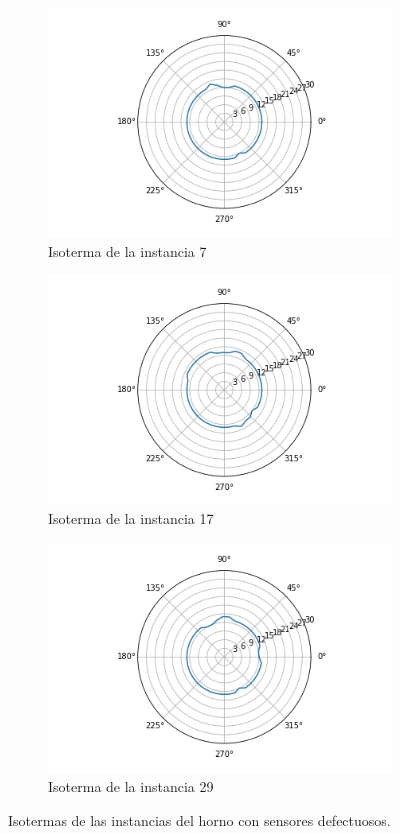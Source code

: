 \begin{figure}[H]
    \centering
    \begin{subfigure}{0.49\linewidth}
        \centering
        \includegraphics[scale=0.49]{img/EXP4/D4_30_40_7_isoterma.png}
        \caption{Isoterma de la instancia 7}
        \label{fig:iso_3b_7}
    \end{subfigure}
    \hfill
    \begin{subfigure}{0.49\linewidth}
        \centering
        \includegraphics[scale=0.49]{img/EXP4/D4_30_40_17_isoterma.png}
        \caption{Isoterma de la instancia 17}
        \label{fig:iso_3b_17}
    \end{subfigure}
    \hfill
    \begin{subfigure}{0.49\linewidth}
        \centering
        \includegraphics[scale=0.49]{img/EXP4/D4_30_40_29_isoterma.png}
        \caption{Isoterma de la instancia 29}
        \label{fig:iso_3b_29}
    \end{subfigure}
    \caption{Isotermas de las instancias del horno con sensores defectuosos.}
    \label{fig:isos_3b}
\end{figure}


